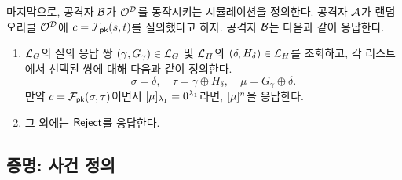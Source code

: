 \documentclass{article}
\theoremstyle{definition}
\begin{document}

마지막으로, 공격자 $\bdv$가 $\orc^{\dec}$를 동작시키는 시뮬레이션을 정의한다. 공격자
$\adv$가 랜덤 오라클 $\orc^{\dec}$에 $\ct = \td_{\pk}(s, t)$를 질의했다고 하자. 공격자
$\bdv$는 다음과 같이 응답한다.
\begin{enumerate}
	\item $\orcl_{\gash}$의 질의 응답 쌍 $(\gamma, G_\gamma) \in \orcl_{\gash}$
	및 $\orcl_{\hash}$의 $(\delta, H_\delta) \in \orcl_{\hash}$를 조회하고, 각
	리스트에서 선택된 쌍에 대해 다음과 같이 정의한다.
	$$
		\sigma = \delta, 
		\quad \tau = \gamma \oplus H_\delta, 
		\quad \mu = G_\gamma \oplus \delta.
	$$
	만약 $\ct = \td_{\pk}(\sigma, \tau)$이면서 $[\mu]_{\sp_1} = 0^{\sp_1}$라면,
	$[\mu]^{\mlen}$을 응답한다.
	\item 그 외에는 $\reject$를 응답한다.
\end{enumerate}

\subsection{증명: 사건 정의}

\newcommand{\askG}{\textsf{AskG}}
\newcommand{\askH}{\textsf{AskH}}
\newcommand{\Gbad}{\textsf{GBad}}
\newcommand{\Dbad}{\textsf{DBad}}
\newcommand{\Bad}{\textsf{Bad}}
\newcommand{\Sbad}{\textsf{SBad}}
\newcommand{\Rbad}{\textsf{RBad}}
\newcommand{\Cbad}{\textsf{CBad}}
\newcommand{\Fail}{\textsf{Fail}}
\newcommand{\askR}{\textsf{AskR}}
\newcommand{\askS}{\textsf{AskS}}
\newcommand{\askRS}{\textsf{AskRS}}
\end{document}
